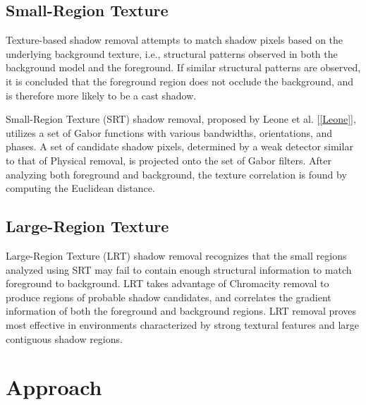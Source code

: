 \subsection{Small-Region Texture}

Texture-based shadow removal attempts to match shadow pixels based on the underlying background texture, i.e., structural patterns observed in both the background model and the foreground. If similar structural patterns are observed, it is concluded that the foreground region does not occlude the background, and is therefore more likely to be a cast shadow.

Small-Region Texture (SRT) shadow removal, proposed by Leone et al. [\ref{Leone}], utilizes a set of Gabor functions with various bandwidths, orientations, and phases. A set of candidate shadow pixels, determined by a weak detector similar to that of Physical removal, is projected onto the set of Gabor filters. After analyzing both foreground and background, the texture correlation is found by computing the Euclidean distance.

\subsection{Large-Region Texture}

Large-Region Texture (LRT) shadow removal recognizes that the small regions analyzed using SRT may fail to contain enough structural information to match foreground to background. LRT takes advantage of Chromacity removal to produce regions of probable shadow candidates, and correlates the gradient information of both the foreground and background regions. LRT removal proves most effective in environments characterized by strong textural features and large contiguous shadow regions.


\section{Approach} \label{section:approach}

